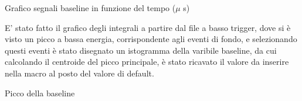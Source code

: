 \begin{grafico}
 \centering
 \caption{Grafico segnali baseline in funzione del tempo ($\mu$ s)} 
 \label{gr:misura600fondo} 
\end{grafico}

E' stato fatto il grafico degli integrali a partire dal file a basso trigger, dove si è visto un picco a bassa energia, corrispondente agli eventi di fondo, e selezionando questi eventi è stato disegnato un istogramma della varibile baseline, da cui calcolando il centroide del picco principale, è stato ricavato il valore da inserire nella macro al posto del valore di default.

\begin{grafico}
 \centering
 \caption{Picco della baseline} 
 \label{gr:misura600fondo_baseline} 
\end{grafico}

